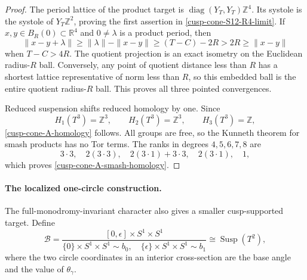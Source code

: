 \begin{proof}
The period lattice of the product target is
\(\operatorname{diag}(Y_T,Y_T)\mathbb Z^4\).  Its systole is the systole of
\(Y_T\mathbb Z^2\), proving the first assertion in
\cref{cusp-cone-S12-R4-limit}.  If \(x,y\in B_R(0)\subset\mathbb R^4\)
and \(0\ne\lambda\) is a product period, then
\[
 \|x-y+\lambda\|\geq\|\lambda\|-\|x-y\|
 \geq(T-C)-2R>2R\geq\|x-y\|
\]
when \(T-C>4R\).  The quotient projection is an exact isometry on the
Euclidean radius-\(R\) ball.  Conversely, any point of quotient distance
less than \(R\) has a shortest lattice representative of norm less than
\(R\), so this embedded ball is the entire quotient radius-\(R\) ball.
This proves all three pointed convergences.

Reduced suspension shifts reduced homology by one.  Since
\[
 H_1(T^3)=\mathbb Z^3,\qquad
 H_2(T^3)=\mathbb Z^3,\qquad H_3(T^3)=\mathbb Z,
\]
\cref{cusp-cone-A-homology} follows.  All groups are free, so the Kunneth
theorem for smash products has no Tor terms.  The ranks in degrees
\(4,5,6,7,8\) are
\[
 3\cdot3,\quad 2(3\cdot3),\quad
 2(3\cdot1)+3\cdot3,\quad 2(3\cdot1),\quad1,
\]
which proves \cref{cusp-cone-A-smash-homology}.
\end{proof}

\paragraph{The localized one-circle construction.}
The full-monodromy-invariant character also gives a smaller cusp-supported
target.  Define
\begin{equation}
 \mathcal B=
 \frac{[0,\epsilon]\times S^1\times S^1}
 {\{0\}\times S^1\times S^1\sim b_0,\quad
  \{\epsilon\}\times S^1\times S^1\sim b_1}
 \cong\operatorname{Susp}(T^2),
 \label{cusp-cone-B-definition}
\end{equation}
where the two circle coordinates in an interior cross-section are the base
angle and the value of \(\theta_\gamma\).

